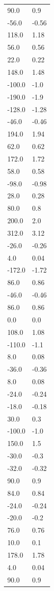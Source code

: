 \begin{longtable}{ll}
90.0 & 0.9 \\
-56.0 & -0.56 \\
118.0 & 1.18 \\
56.0 & 0.56 \\
22.0 & 0.22 \\
148.0 & 1.48 \\
-100.0 & -1.0 \\
-190.0 & -1.9 \\
-128.0 & -1.28 \\
-46.0 & -0.46 \\
194.0 & 1.94 \\
62.0 & 0.62 \\
172.0 & 1.72 \\
58.0 & 0.58 \\
-98.0 & -0.98 \\
28.0 & 0.28 \\
80.0 & 0.8 \\
200.0 & 2.0 \\
312.0 & 3.12 \\
-26.0 & -0.26 \\
4.0 & 0.04 \\
-172.0 & -1.72 \\
86.0 & 0.86 \\
-46.0 & -0.46 \\
86.0 & 0.86 \\
0.0 & 0.0 \\
108.0 & 1.08 \\
-110.0 & -1.1 \\
8.0 & 0.08 \\
-36.0 & -0.36 \\
8.0 & 0.08 \\
-24.0 & -0.24 \\
-18.0 & -0.18 \\
30.0 & 0.3 \\
-100.0 & -1.0 \\
150.0 & 1.5 \\
-30.0 & -0.3 \\
-32.0 & -0.32 \\
90.0 & 0.9 \\
84.0 & 0.84 \\
-24.0 & -0.24 \\
-20.0 & -0.2 \\
76.0 & 0.76 \\
10.0 & 0.1 \\
178.0 & 1.78 \\
4.0 & 0.04 \\
90.0 & 0.9 \\

\end{longtable}
